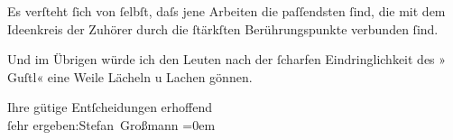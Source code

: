 \pstart
           Es verſteht{ }ſich von{ }ſelbſt, daſs jene Arbeiten die paſſendsten{ }ſind, die mit dem
               Ideenkreis der Zuhörer \introOben{}durch\introOben{} die{ }ſtärkſten  Berührungspunkte verbunden{ }ſind.\pend
           
\pstart
           Und im Übrigen würde ich den Leuten nach der{ }ſcharfen Eindringlichkeit des »\label{T_L01717-2v}\label{T_L01717-2} Guſtl«
               eine  Weile Lächeln u Lachen gönnen.\pend
           
\pstart
           Ihre gütige Entſcheidungen erhoffend{\\[\baselineskip]}ſehr ergeben:\spacefill\mbox{Stefan
                  Großmann}\pend
           \leftskip=0em{}\endnumbering{}  \newcommand{\dateiname}{L01717}\newcommand{\titel}{Stefan Großmann an Arthur Schnitzler, 7. 10. 1907}\newcommand{\editorInnen}{Herausgegeben von Martin Anton Müller}
